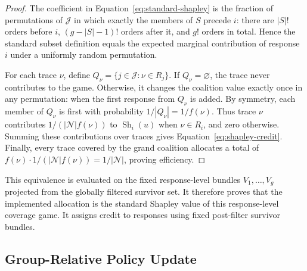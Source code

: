 \begin{proof}
The coefficient in Equation~\eqref{eq:standard-shapley} is the fraction of
permutations of \(\mathcal J\) in which exactly the members of \(S\) precede \(i\):
there are \(|S|!\) orders before \(i\), \((g-|S|-1)!\) orders after it, and
\(g!\) orders in total.  Hence the standard subset definition equals the
expected marginal contribution of response \(i\) under a uniformly random
permutation.

For each trace \(\nu\), define
\(Q_\nu=\{j\in\mathcal J:\nu\in R_j\}\).  If \(Q_\nu=\varnothing\), the trace never
contributes to the game.  Otherwise, it changes the coalition value exactly
once in any permutation: when the first response from \(Q_\nu\) is added.
By symmetry, each member of \(Q_\nu\) is first with probability
\(1/|Q_\nu|=1/f(\nu)\).  Thus trace \(\nu\) contributes
\(1/(|\mathcal N|f(\nu))\) to \(\operatorname{Sh}_i(u)\) when
\(\nu\in R_i\), and zero otherwise.  Summing these contributions over traces
gives Equation~\eqref{eq:shapley-credit}.  Finally, every trace covered by the
grand coalition allocates a total of
\(f(\nu)\cdot 1/(|\mathcal N|f(\nu))=1/|\mathcal N|\), proving efficiency.
\end{proof}

This equivalence is evaluated on the fixed response-level bundles
\(V_1,\ldots,V_g\) projected from the globally filtered survivor set.  It
therefore proves that the implemented allocation is the standard Shapley value
of this response-level coverage game. It assigns credit to responses using
fixed post-filter survivor bundles.


\subsection{Group-Relative Policy Update}
\label{app:grpo-details}


